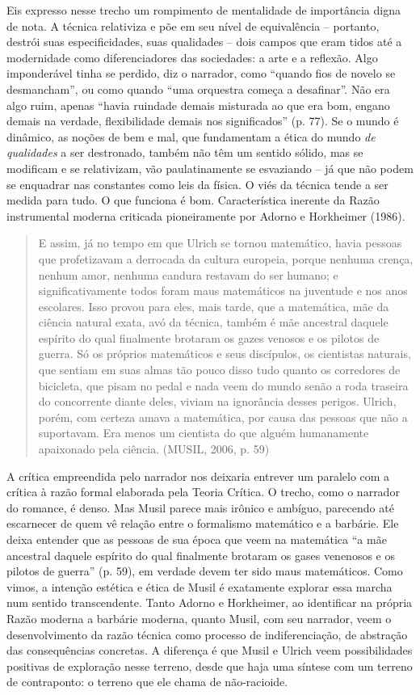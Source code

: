 Eis expresso nesse trecho um rompimento de mentalidade de importância
digna de nota. A técnica relativiza e põe em seu nível de equivalência
-- portanto, destrói suas especificidades, suas qualidades -- dois
campos que eram tidos até a modernidade como diferenciadores das
sociedades: a arte e a reflexão. Algo imponderável tinha se perdido, diz
o narrador, como ``quando fios de novelo se desmancham'', ou como quando
``uma orquestra começa a desafinar''. Não era algo ruim, apenas ``havia
ruindade demais misturada ao que era bom, engano demais na verdade,
flexibilidade demais nos significados'' (p. 77). Se o mundo é dinâmico,
as noções de bem e mal, que fundamentam a ética do mundo \emph{de
qualidades} a ser destronado, também não têm um sentido sólido, mas se
modificam e se relativizam, vão paulatinamente se esvaziando -- já que
não podem se enquadrar nas constantes como leis da física. O viés da
técnica tende a ser medida para tudo. O que funciona é bom.
Característica inerente da Razão instrumental moderna criticada
pioneiramente por Adorno e Horkheimer (1986).

\begin{quote}
E assim, já no tempo em que Ulrich se tornou matemático, havia pessoas
que profetizavam a derrocada da cultura europeia, porque nenhuma crença,
nenhum amor, nenhuma candura restavam do ser humano; e
significativamente todos foram maus matemáticos na juventude e nos anos
escolares. Isso provou para eles, mais tarde, que a matemática, mãe da
ciência natural exata, avó da técnica, também é mãe ancestral daquele
espírito do qual finalmente brotaram os gazes venosos e os pilotos de
guerra. Só os próprios matemáticos e seus discípulos, os cientistas
naturais, que sentiam em suas almas tão pouco disso tudo quanto os
corredores de bicicleta, que pisam no pedal e nada veem do mundo senão a
roda traseira do concorrente diante deles, viviam na ignorância desses
perigos. Ulrich, porém, com certeza amava a matemática, por causa das
pessoas que não a suportavam. Era menos um cientista do que alguém
humanamente apaixonado pela ciência. (MUSIL, 2006, p. 59)
\end{quote}

A crítica empreendida pelo narrador nos deixaria entrever um paralelo
com a crítica à razão formal elaborada pela Teoria Crítica. O trecho,
como o narrador do romance, é denso. Mas Musil parece mais irônico e
ambíguo, parecendo até escarnecer de quem vê relação entre o formalismo
matemático e a barbárie. Ele deixa entender que as pessoas de sua época
que veem na matemática ``a mãe ancestral daquele espírito do qual
finalmente brotaram os gases venenosos e os pilotos de guerra'' (p. 59),
em verdade devem ter sido maus matemáticos. Como vimos, a intenção
estética e ética de Musil é exatamente explorar essa marcha num sentido
transcendente. Tanto Adorno e Horkheimer, ao identificar na própria
Razão moderna a barbárie moderna, quanto Musil, com seu narrador, veem o
desenvolvimento da razão técnica como processo de indiferenciação, de
abstração das consequências concretas. A diferença é que Musil e Ulrich
veem possibilidades positivas de exploração nesse terreno, desde que
haja uma síntese com um terreno de contraponto: o terreno que ele chama
de não-racioide.


